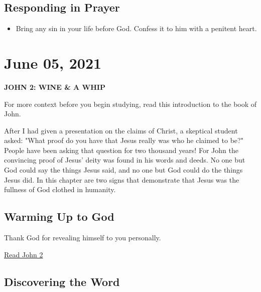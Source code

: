 \documentclass[11pt]{article}
\begin{document}
\subsection{Responding in Prayer}
\label{sec:org8821738}

\begin{itemize}
\item Bring any sin in your life before God. Confess it to him with a
penitent heart.
\end{itemize}

\section{June 05, 2021}
\label{sec:org0194a11}

\textbf{\textbf{JOHN 2: WINE \& A WHIP}}

For more context before you begin studying, read this introduction to the book
of John.

After I had given a presentation on the claims of Christ, a skeptical student
asked: "What proof do you have that Jesus really was who he claimed to be?"
People have been asking that question for two thousand years! For John the
convincing proof of Jesus’ deity was found in his words and deeds. No one but
God could say the things Jesus said, and no one but God could do the things
Jesus did. In this chapter are two signs that demonstrate that Jesus was the
fullness of God clothed in humanity.

\subsection{Warming Up to God}
\label{sec:org830ca3a}

Thank God for revealing himself to you personally.

\href{https://www.biblegateway.com/passage/?search=John\%202\&version=NIV\&interface=print}{Read John 2}

\subsection{Discovering the Word}
\label{sec:org0a0ce6b}
\end{document}
